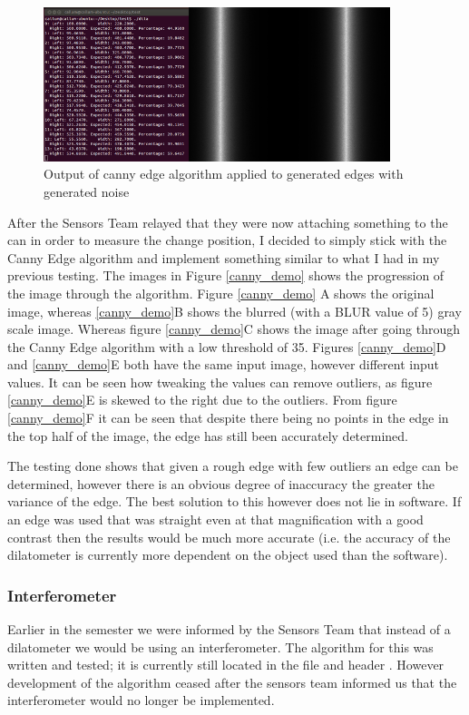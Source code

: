 \begin{figure}[H]
	\centering
	\includegraphics[width=0.9\textwidth]{figures/canny_edges_noise.png}
	\caption{Output of canny edge algorithm applied to generated edges with generated noise} 
	\label{canny_edges_noise.png}
\end{figure}

After the Sensors Team relayed that they were now attaching something to the can in order to measure the change position, I decided to simply stick with the Canny Edge algorithm and implement something similar to what I had in my previous testing.  The images in Figure \ref{canny_demo} shows the progression of the image through the algorithm.  Figure \ref{canny_demo} A shows the original image, whereas \ref{canny_demo}B shows the blurred (with a BLUR value of 5) gray scale image.  Whereas figure \ref{canny_demo}C shows the image after going through the Canny Edge algorithm with a low threshold of 35.   Figures \ref{canny_demo}D and \ref{canny_demo}E both have the same input image, however different input values.  It can be seen how tweaking the values can remove outliers, as figure \ref{canny_demo}E is skewed to the right due to the outliers.  From figure \ref{canny_demo}F it can be seen that despite there being no points in the edge in the top half of the image, the edge has still been accurately determined.  

The testing done shows that given a rough edge with few outliers an edge can be determined, however there is an obvious degree of inaccuracy the greater the variance of the edge. The best solution to this however does not lie in software.  If an edge was used that was straight even at that magnification with a good contrast then the results would be much more accurate (i.e. the accuracy of the dilatometer is currently more dependent on the object used than the software). 

\subsubsection{Interferometer}
Earlier in the semester we were informed by the Sensors Team that instead of a dilatometer we would be using an interferometer.  The algorithm for this was written and tested; it is currently still located in the file  and header . However development of the algorithm ceased after the sensors team informed us that the interferometer would no longer be implemented.


